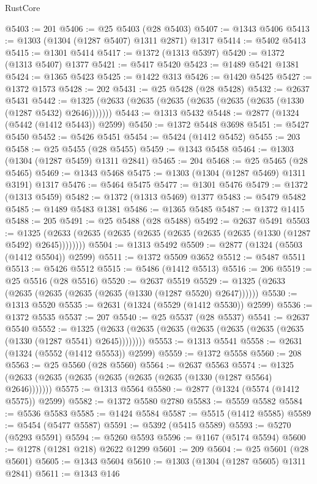 \begin{lexlean}{RustCore}
\begin{coremodule}
@5403 := 201
@5406 := @25 @5403 (@28 @5403)
@5407 := @1343 @5406
@5413 := @1303 (@1304 (@1287 @5407) @1311 @2871) @1317
@5414 := @5402 @5413
@5415 := @1301 @5414
@5417 := @1372 (@1313 @5397)
@5420 := @1372 (@1313 @5407) @1377
@5421 := @5417 @5420
@5423 := @1489 @5421 @1381
@5424 := @1365 @5423
@5425 := @1422 @313
@5426 := @1420 @5425
@5427 := @1372 @1573
@5428 := 202
@5431 := @25 @5428 (@28 @5428)
@5432 := @2637 @5431
@5442 := @1325 (@2633 (@2635 (@2635 (@2635 (@2635 (@2635 (@1330 (@1287 @5432) @2646)))))))
@5443 := @1313 @5432
@5448 := @2877 (@1324 (@5442 (@1412 @5443)) @2599)
@5450 := @1372 @5448 @3698
@5451 := @5427 @5450
@5452 := @5426 @5451
@5454 := @5424 (@1412 @5452)
@5455 := 203
@5458 := @25 @5455 (@28 @5455)
@5459 := @1343 @5458
@5464 := @1303 (@1304 (@1287 @5459) @1311 @2841)
@5465 := 204
@5468 := @25 @5465 (@28 @5465)
@5469 := @1343 @5468
@5475 := @1303 (@1304 (@1287 @5469) @1311 @3191) @1317
@5476 := @5464 @5475
@5477 := @1301 @5476
@5479 := @1372 (@1313 @5459)
@5482 := @1372 (@1313 @5469) @1377
@5483 := @5479 @5482
@5485 := @1489 @5483 @1381
@5486 := @1365 @5485
@5487 := @1372 @1415
@5488 := 205
@5491 := @25 @5488 (@28 @5488)
@5492 := @2637 @5491
@5503 := @1325 (@2633 (@2635 (@2635 (@2635 (@2635 (@2635 (@2635 (@1330 (@1287 @5492) @2645))))))))
@5504 := @1313 @5492
@5509 := @2877 (@1324 (@5503 (@1412 @5504)) @2599)
@5511 := @1372 @5509 @3652
@5512 := @5487 @5511
@5513 := @5426 @5512
@5515 := @5486 (@1412 @5513)
@5516 := 206
@5519 := @25 @5516 (@28 @5516)
@5520 := @2637 @5519
@5529 := @1325 (@2633 (@2635 (@2635 (@2635 (@2635 (@1330 (@1287 @5520) @2647))))))
@5530 := @1313 @5520
@5535 := @2631 (@1324 (@5529 (@1412 @5530)) @2599)
@5536 := @1372 @5535
@5537 := 207
@5540 := @25 @5537 (@28 @5537)
@5541 := @2637 @5540
@5552 := @1325 (@2633 (@2635 (@2635 (@2635 (@2635 (@2635 (@2635 (@1330 (@1287 @5541) @2645))))))))
@5553 := @1313 @5541
@5558 := @2631 (@1324 (@5552 (@1412 @5553)) @2599)
@5559 := @1372 @5558
@5560 := 208
@5563 := @25 @5560 (@28 @5560)
@5564 := @2637 @5563
@5574 := @1325 (@2633 (@2635 (@2635 (@2635 (@2635 (@2635 (@1330 (@1287 @5564) @2646)))))))
@5575 := @1313 @5564
@5580 := @2877 (@1324 (@5574 (@1412 @5575)) @2599)
@5582 := @1372 @5580 @2780
@5583 := @5559 @5582
@5584 := @5536 @5583
@5585 := @1424 @5584
@5587 := @5515 (@1412 @5585)
@5589 := @5454 (@5477 @5587)
@5591 := @5392 (@5415 @5589)
@5593 := @5270 (@5293 @5591)
@5594 := @5260 @5593
@5596 := @1167 (@5174 @5594)
@5600 := @1278 (@1281 @218) @2622 @1299
@5601 := 209
@5604 := @25 @5601 (@28 @5601)
@5605 := @1343 @5604
@5610 := @1303 (@1304 (@1287 @5605) @1311 @2841)
@5611 := @1343 @146

\end{coremodule}
\end{lexlean}
